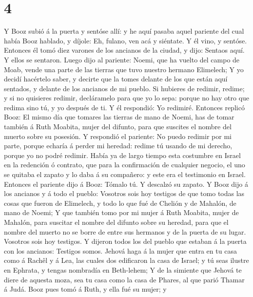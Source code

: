 \hypertarget{section-3}{%
\section{4}\label{section-3}}

 Y Booz subió á la puerta y sentóse allí: y he aquí pasaba
aquel pariente del cual había Booz hablado, y díjole: Eh, fulano, ven
acá y siéntate. Y él vino, y sentóse.  Entonces él tomó
diez varones de los ancianos de la ciudad, y dijo: Sentaos aquí. Y ellos
se sentaron.  Luego dijo al pariente: Noemi, que ha vuelto
del campo de Moab, vende una parte de las tierras que tuvo nuestro
hermano Elimelech;  Y yo decidí hacértelo saber, y decirte
que la tomes delante de los que están aquí sentados, y delante de los
ancianos de mi pueblo. Si hubieres de redimir, redime; y si no quisieres
redimir, decláramelo para que yo lo sepa: porque no hay otro que redima
sino tú, y yo después de ti. Y él respondió: Yo redimiré. 
Entonces replicó Booz: El mismo día que tomares las tierras de mano de
Noemi, has de tomar también á Ruth Moabita, mujer del difunto, para que
suscites el nombre del muerto sobre su posesión.  Y
respondió el pariente: No puedo redimir por mi parte, porque echaría á
perder mi heredad: redime tú usando de mi derecho, porque yo no podré
redimir.  Había ya de largo tiempo esta costumbre en
Israel en la redención ó contrato, que para la confirmación de cualquier
negocio, el uno se quitaba el zapato y lo daba á su compañero: y este
era el testimonio en Israel.  Entonces el pariente dijo á
Booz: Tómalo tú. Y descalzó su zapato.  Y Booz dijo á los
ancianos y á todo el pueblo: Vosotros sois hoy testigos de que tomo
todas las cosas que fueron de Elimelech, y todo lo que fué de Chelión y
de Mahalón, de mano de Noemi;  Y que también tomo por mi
mujer á Ruth Moabita, mujer de Mahalón, para suscitar el nombre del
difunto sobre su heredad, para que el nombre del muerto no se borre de
entre sus hermanos y de la puerta de su lugar. Vosotros sois hoy
testigos.  Y dijeron todos los del pueblo que estaban á
la puerta con los ancianos: Testigos somos. Jehová haga á la mujer que
entra en tu casa como á Rachêl y á Lea, las cuales dos edificaron la
casa de Israel; y tú seas ilustre en Ephrata, y tengas nombradía en
Beth-lehem;  Y de la simiente que Jehová te diere de
aquesta moza, sea tu casa como la casa de Phares, al que parió Thamar á
Judá.  Booz pues tomó á Ruth, y ella fué su mujer; y
